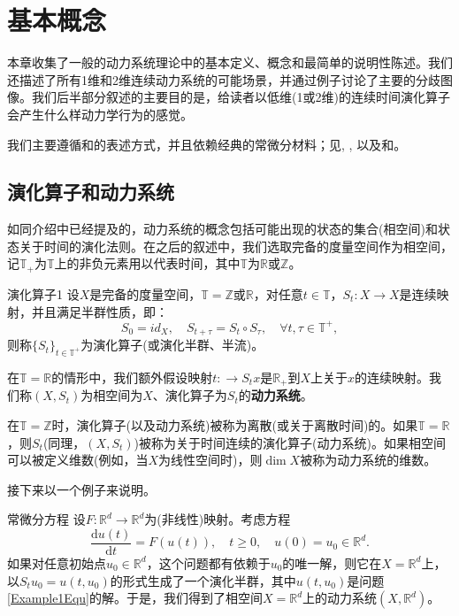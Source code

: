 \chapter{基本概念}

本章收集了一般的动力系统理论中的基本定义、概念和最简单的说明性陈述。我们还描述了所有1维和2维连续动力系统的可能场景，并通过例子讨论了主要的分歧图像。我们后半部分叙述的主要目的是，给读者以低维(1或2维)的连续时间演化算子会产生什么样动力学行为的感觉。

我们主要遵循\cite{Nemytskii60}和\cite{Sibirsky75}的表述方式，并且依赖经典的常微分材料；见\cite{Coddington55}, \cite{Hartman02}, \cite{Lefschetz77}以及\cite{Lefschetz77}和\cite{Lefschetz74}。

\section{演化算子和动力系统}
如同介绍中已经提及的，动力系统的概念包括可能出现的状态的集合(相空间)和状态关于时间的演化法则。在之后的叙述中，我们选取完备的度量空间作为相空间，记$\mathbb{T}_{+}$为$\mathbb{T}$上的非负元素用以代表时间，其中$\mathbb{T}$为$\mathbb{R}$或$\mathbb{Z}$。

\begin{defination}{演化算子}{1}
	设$X$是完备的度量空间，$\mathbb{T}=\mathbb{Z}$或$\mathbb{R}$，对任意$t\in\mathbb{T}$，$S_{t}:X\to X$是连续映射，并且满足半群性质，即：$$S_{0}=id_{X},\quad S_{t+\tau}=S_{t}\circ S_{\tau},\quad\forall t,\tau\in\mathbb{T}^{+},$$则称$\{S_{t}\}_{t\in \mathbb{T}^{+}}$为演化算子(或演化半群、半流)。
\end{defination}

在$\mathbb{T}=\mathbb{R}$的情形中，我们额外假设映射$t:\to S_{t}x$是$\mathbb{R}_{+}$到$X$上关于$x$的连续映射。我们称$(X,S_{t})$为相空间为$X$、演化算子为$S_{t}$的\textbf{动力系统}。

在$\mathbb{T}=\mathbb{Z}$时，演化算子(以及动力系统)被称为离散(或关于离散时间)的。如果$\mathbb{T}=\mathbb{R}$，则$S_{t}$(同理，$(X,S_{t})$)被称为关于时间连续的演化算子(动力系统)。如果相空间可以被定义维数(例如，当$X$为线性空间时)，则$\dim X$被称为动力系统的维数。

接下来以一个例子来说明。

\begin{example}{常微分方程}
	设$F:\mathbb{R}^{d}\to\mathbb{R}^{d}$为(非线性)映射。考虑方程
	\begin{equation}\label{Example1Equ}
		\frac{\mathrm{d}u(t)}{\mathrm{d}t}=F(u(t)),\quad t\geqslant 0,\quad u(0)=u_{0}\in\mathbb{R}^{d}.
	\end{equation}
	如果对任意初始点$u_{0}\in\mathbb{R}^{d}$，这个问题都有依赖于$u_{0}$的唯一解，则它在$X=\mathbb{R}^{d}$上，以$S_{t}u_{0}=u(t,u_{0})$的形式生成了一个演化半群，其中$u(t,u_{0})$是问题\ref{Example1Equ}的解。于是，我们得到了相空间$X=\mathbb{R}^{d}$上的动力系统$(X,\mathbb{R}^{d})$。
\end{example}

